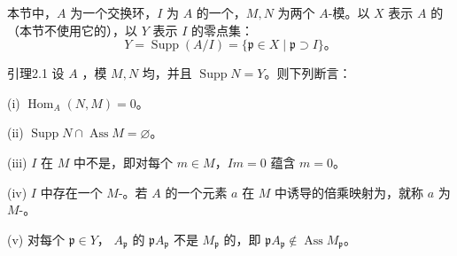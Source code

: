本节中，$A$ 为一个交换环，$I$ 为 $A$ 的一个，$M,N$ 为两个 $A$-模。以 $X$ 表示 $A$ 的（本节不使用它的），以 $Y$ 表示 $I$ 的零点集：
\[
Y=\operatorname{Supp}(A/I)=\{\mathfrak p\in X\mid\mathfrak p\supset I\}。
\]
\begin{SGAresult}{引理}{2.1}
设 $A$ ，模 $M,N$ 均，并且 $\operatorname{Supp}N=Y$。则下列断言：

\textnormal{(i)} $\operatorname{Hom}_A(N,M)=0$。

\textnormal{(ii)} $\operatorname{Supp}N\cap\operatorname{Ass}M=\varnothing$。

\textnormal{(iii)}  $I$ 在 $M$ 中不是，即对每个 $m\in M$，$Im=0$ 蕴含 $m=0$。

\textnormal{(iv)} $I$ 中存在一个 $M$-。若 $A$ 的一个元素 $a$ 在 $M$ 中诱导的倍乘映射为，就称 $a$ 为 $M$-。

\textnormal{(v)} 对每个 $\mathfrak p\in Y$， $A_{\mathfrak p}$ 的 $\mathfrak pA_{\mathfrak p}$ 不是 $M_{\mathfrak p}$ 的，即
$\mathfrak pA_{\mathfrak p}\notin\operatorname{Ass}M_{\mathfrak p}$。
\end{SGAresult}
